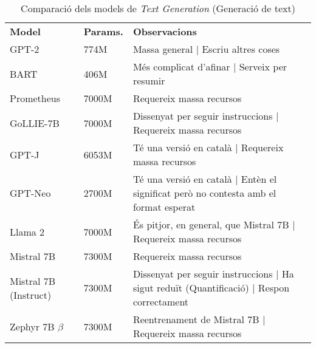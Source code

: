 \begin{table}[H]
    \centering
    \begin{tabular}{|>{\centering}m{2.3cm}|m{1.6cm}|m{10.7cm}|}
        \hline
        \multicolumn{3}{|c|}{\textbf{Models de \textit{Text Generation}}} \\
        \hline
        \textbf{Model} & \textbf{Params.} & \textbf{Observacions} \\
        \hline
        GPT-2 & 774M & Massa general | Escriu altres coses \\
        BART & 406M & Més complicat d'afinar | Serveix per resumir \\
        Prometheus & 7000M & Requereix massa recursos \\
        GoLLIE-7B & 7000M & Dissenyat per seguir instruccions | Requereix massa recursos \\
        GPT-J & 6053M & Té una versió en català | Requereix massa recursos \\
        GPT-Neo & 2700M & Té una versió en català | Entèn el significat però no contesta amb el format esperat \\
        Llama 2 & 7000M & És pitjor, en general, que Mistral 7B | Requereix massa recursos \\
        Mistral 7B & 7300M & Requereix massa recursos \\
        Mistral 7B (Instruct) & 7300M & Dissenyat per seguir instruccions | Ha sigut reduït (Quantificació) | Respon correctament \\
        Zephyr 7B $\beta$ & 7300M & Reentrenament de Mistral 7B | Requereix massa recursos \\
        \hline
    \end{tabular}
    \caption{Comparació dels models de \textit{Text Generation} (Generació de text)}
    \label{tab:tg-comparison}
\end{table}

